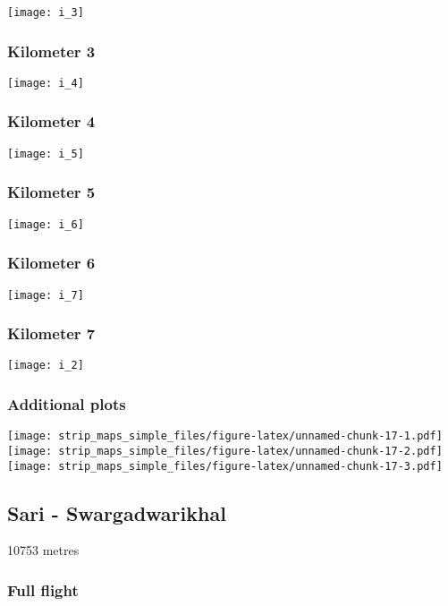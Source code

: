 \documentclass[]{article}
\begin{document}
\texttt{[image: i\_3]}

\subsubsection{Kilometer 3}\label{kilometer-3-8}

\texttt{[image: i\_4]}

\subsubsection{Kilometer 4}\label{kilometer-4-8}

\texttt{[image: i\_5]}

\subsubsection{Kilometer 5}\label{kilometer-5-8}

\texttt{[image: i\_6]}

\subsubsection{Kilometer 6}\label{kilometer-6-8}

\texttt{[image: i\_7]}

\subsubsection{Kilometer 7}\label{kilometer-7-7}

\texttt{[image: i\_2]}

\subsubsection{Additional plots}\label{additional-plots-8}

\texttt{[image: strip\_maps\_simple\_files/figure-latex/unnamed-chunk-17-1.pdf]}
\texttt{[image: strip\_maps\_simple\_files/figure-latex/unnamed-chunk-17-2.pdf]}
\texttt{[image: strip\_maps\_simple\_files/figure-latex/unnamed-chunk-17-3.pdf]}

\newpage

\subsection{Sari - Swargadwarikhal}\label{sari---swargadwarikhal}

10753 metres

\subsubsection{Full flight}\label{full-flight-9}
\end{document}
